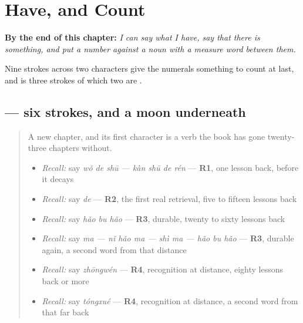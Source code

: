 
\chapter{Have, and Count}
\label{ch:zh-you-ge}

\begin{chapteropening}
\textbf{By the end of this chapter:} \emph{I can say what I have, say that there is something, and put a number against a noun with a measure word between them.}

Nine strokes across two characters give the numerals something to count at last, and  is three strokes of which two are .
\end{chapteropening}

\section[\texorpdfstring{\zh{有} (yǒu)}{有 (yǒu)}]{ — six strokes, and a moon underneath}

\label{lesson:ZH-W24-you}



\begin{quote}
A new chapter, and its first character is a verb the book has gone twenty-three chapters without.

\begin{itemize}
\raggedright
  \item \emph{Recall:} say \emph{wǒ de shū — kàn shū de rén} — \textbf{R1}, one lesson back, before it decays
  \item \emph{Recall:} say \emph{de} — \textbf{R2}, the first real retrieval, five to fifteen lessons back
  \item \emph{Recall:} say \emph{hǎo bu hǎo} — \textbf{R3}, durable, twenty to sixty lessons back
  \item \emph{Recall:} say \emph{ma — nǐ hǎo ma — shì ma — hǎo bu hǎo} — \textbf{R3}, durable again, a second word from that distance
  \item \emph{Recall:} say \emph{zhōngwén} — \textbf{R4}, recognition at distance, eighty lessons back or more
  \item \emph{Recall:} say \emph{tóngxué} — \textbf{R4}, recognition at distance, a second word from that far back
\end{itemize}
\end{quote}

